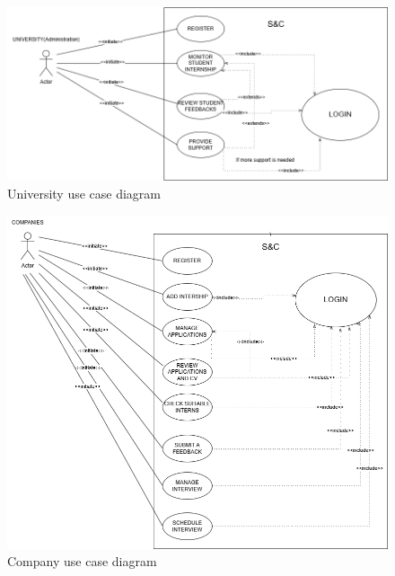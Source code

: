 \begin{figure}[ht!]
    \centering
    \includegraphics[scale=0.40]{Images/ImagesRASD/ScenariosStateDiagram-UseCaseDiagram_Universities.drawio.png}
    \caption{University use case diagram}

\end{figure}

\begin{figure}[ht!]
    \centering
    \includegraphics[scale=0.40]{Images/ImagesRASD/ScenariosStateDiagram-UseCaseDiagram_Companies.drawio.png}
    \caption{Company use case diagram}

\end{figure}

\clearpage

